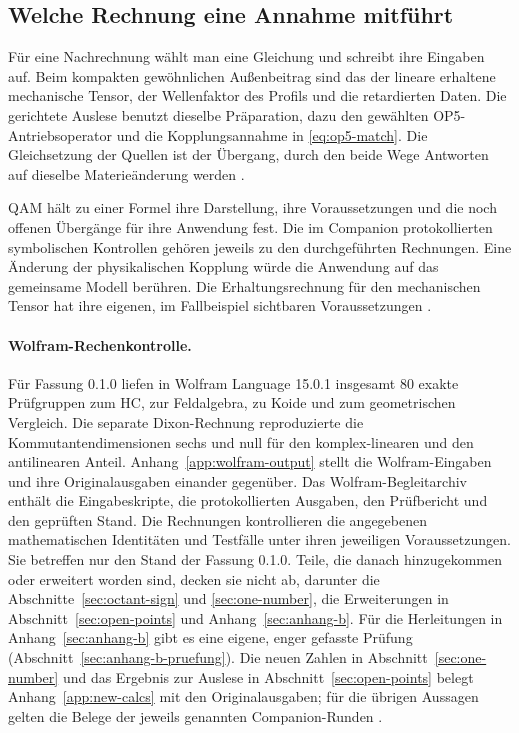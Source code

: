 \subsection{Welche Rechnung eine Annahme mitführt}

Für eine Nachrechnung wählt man eine Gleichung und schreibt ihre Eingaben auf. Beim kompakten gewöhnlichen Außenbeitrag sind das der lineare erhaltene mechanische Tensor, der Wellenfaktor des Profils und die retardierten Daten. Die gerichtete Auslese benutzt dieselbe Präparation, dazu den gewählten OP5-Antriebsoperator und die Kopplungsannahme in \eqref{eq:op5-match}. Die Gleichsetzung der Quellen ist der Übergang, durch den beide Wege Antworten auf dieselbe Materieänderung werden \cite{op5-motion,op5}.

QAM hält zu einer Formel ihre Darstellung, ihre Voraussetzungen und die noch offenen Übergänge für ihre Anwendung fest. Die im Companion protokollierten symbolischen Kontrollen gehören jeweils zu den durchgeführten Rechnungen. Eine Änderung der physikalischen Kopplung würde die Anwendung auf das gemeinsame Modell berühren. Die Erhaltungsrechnung für den mechanischen Tensor hat ihre eigenen, im Fallbeispiel sichtbaren Voraussetzungen \cite{qam,op5-motion}.

\paragraph{Wolfram-Rechenkontrolle.}
Für Fassung 0.1.0 liefen in Wolfram Language 15.0.1 insgesamt 80 exakte Prüfgruppen zum HC, zur Feldalgebra, zu Koide und zum geometrischen Vergleich. Die separate Dixon-Rechnung reproduzierte die Kommutantendimensionen sechs und null für den komplex-linearen und den antilinearen Anteil. Anhang~\ref{app:wolfram-output} stellt die Wolfram-Eingaben und ihre Originalausgaben einander gegenüber. Das Wolfram-Begleitarchiv enthält die Eingabeskripte, die protokollierten Ausgaben, den Prüfbericht und den geprüften Stand. Die Rechnungen kontrollieren die angegebenen mathematischen Identitäten und Testfälle unter ihren jeweiligen Voraussetzungen. Sie betreffen nur den Stand der Fassung 0.1.0. Teile, die danach hinzugekommen oder erweitert worden sind, decken sie nicht ab, darunter die Abschnitte~\ref{sec:octant-sign} und \ref{sec:one-number}, die Erweiterungen in Abschnitt~\ref{sec:open-points} und Anhang~\ref{sec:anhang-b}. Für die Herleitungen in Anhang~\ref{sec:anhang-b} gibt es eine eigene, enger gefasste Prüfung (Abschnitt~\ref{sec:anhang-b-pruefung}). Die neuen Zahlen in Abschnitt~\ref{sec:one-number} und das Ergebnis zur Auslese in Abschnitt~\ref{sec:open-points} belegt Anhang~\ref{app:new-calcs} mit den Originalausgaben; für die übrigen Aussagen gelten die Belege der jeweils genannten Companion-Runden \cite{companion,layers}.

